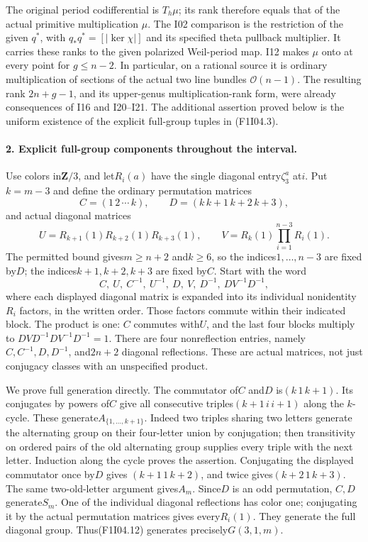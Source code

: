 The original period codifferential is $T_h\mu$;
its rank therefore equals that of the actual primitive
multiplication $\mu$. The I02 comparison is the restriction
of the given $q^*$, with $q_*q^*=[|\ker\chi|]$ and its
specified theta pullback multiplier. It carries these
ranks to the given polarized Weil-period map. I12 makes
$\mu$ onto at every point for $g\le n-2$. In particular,
on a rational source it is ordinary multiplication of
sections of the actual two line bundles $\mathcal O(n-1)$.
The resulting rank $2n+g-1$, and its upper-genus
multiplication-rank form, were already consequences of
I16 and I20--I21. The additional assertion proved below
is the uniform existence of the explicit full-group tuples
in (F1I04.3).

\paragraph{2. Explicit full-group components throughout the interval.}
Use colors in$\mathbf Z/3$, and let$R_i(a)$ have the single
diagonal entry$\zeta_3^a$ at$i$. Put$k=m-3$ and define the
ordinary permutation matrices
\[
 C=(1\,2\,\cdots\,k),\qquad
 D=(k\,k+1\,k+2\,k+3),
\]
and actual diagonal matrices
\[
 U=R_{k+1}(1)R_{k+2}(1)R_{k+3}(1),\qquad
 V=R_k(1)\prod_{i=1}^{n-3}R_i(1).                    \tag{F1I04.11}
\]
The permitted bound gives$m\ge n+2$ and$k\ge6$, so the indices$1,\ldots,n-3$ are fixed by$D$;
the indices$k+1,k+2,k+3$ are fixed by$C$.
Start with the word
\[
       C,\ U,\ C^{-1},\ U^{-1},\
       D,\ V,\ D^{-1},\ DV^{-1}D^{-1},                \tag{F1I04.12}
\]
where each displayed diagonal matrix is expanded into its
individual nonidentity$R_i$ factors, in the written order.
Those factors commute within their indicated block.
The product is one: $C$ commutes with$U$, and the last
four blocks multiply to
$DVD^{-1}DV^{-1}D^{-1}=1$. There are four nonreflection
entries, namely$C,C^{-1},D,D^{-1}$, and$2n+2$ diagonal
reflections. These are actual matrices, not just conjugacy
classes with an unspecified product.

We prove full generation directly. The commutator of$C$
and$D$ is$(k\,1\,k+1)$. Its conjugates by powers of$C$
give all consecutive triples$(k+1\,i\,i+1)$ along the
$k$-cycle. These generate$A_{\{1,\ldots,k+1\}}$.
Indeed two triples sharing two letters generate the
alternating group on their four-letter union by conjugation;
then transitivity on ordered pairs of the old alternating
group supplies every triple with the next letter. Induction
along the cycle proves the assertion. Conjugating the
displayed commutator once by$D$ gives
$(k+1\,1\,k+2)$, and twice gives$(k+2\,1\,k+3)$.
The same two-old-letter argument gives$A_m$. Since$D$
is an odd permutation, $C,D$ generate$S_m$. One of the
individual diagonal reflections has color one; conjugating
it by the actual permutation matrices gives every$R_i(1)$.
They generate the full diagonal group. Thus(F1I04.12)
generates precisely$G(3,1,m)$.

